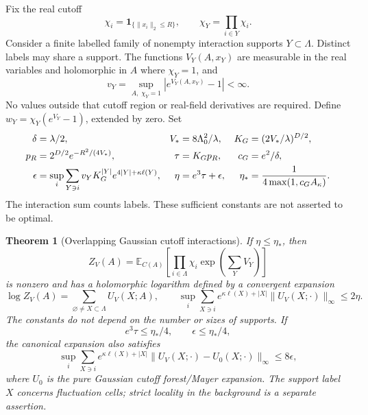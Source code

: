 \documentclass[11pt]{article}
\newtheorem{theorem}{Theorem}[section]
\theoremstyle{remark}
\begin{document}
Fix the real cutoff
\[
 \chi_i=\mathbf1_{\{\|x_i\|_2\le R\}},\qquad
 \chi_Y=\prod_{i\in Y}\chi_i.
\]
Consider a finite labelled family of nonempty interaction supports
$Y\subset\Lambda$. Distinct labels may share a support.
The functions $V_Y(A,x_Y)$ are measurable in the real variables and
holomorphic in $A$ where $\chi_Y=1$, and
\begin{equation}\label{oi-multiplier}
 v_Y=\sup_{A,\;\chi_Y=1}|e^{V_Y(A,x_Y)}-1|<\infty.
\end{equation}
No values outside that cutoff region or real-field derivatives are
required. Define $w_Y=\chi_Y(e^{V_Y}-1)$, extended by zero.
Set
\begin{align}
 \delta&=\lambda/2,&
 V_*&=8\Lambda_0^2/\lambda,&
 K_G&=(2V_*/\lambda)^{D/2},\notag\\
 p_R&=2^{D/2}e^{-R^2/(4V_*)},&
 \tau&=K_Gp_R,& c_G&=e^2/\delta,                 \label{oi-constants}\\
 \epsilon&=\sup_i\sum_{Y\ni i}
      v_Y K_G^{|Y|}e^{4|Y|+\kappa\ell(Y)},&
 \eta&=e^3\tau+\epsilon,&
 \eta_*&=\frac1{4\max(1,c_GA_\kappa)}.           \label{oi-smallness}
\end{align}
The interaction sum counts labels. These sufficient constants are
not asserted to be optimal.

\begin{theorem}[Overlapping Gaussian cutoff interactions]
\label{oi-theorem}
If $\eta\le\eta_*$, then
\[
 Z_V(A)=\mathbb E_{C(A)}
   \left[\prod_{i\in\Lambda}\chi_i
              \exp\left(\sum_YV_Y\right)\right]
\]
is nonzero and has a holomorphic logarithm defined by a convergent
expansion
\begin{equation}\label{oi-log}
 \log Z_V(A)=\sum_{\varnothing\ne X\subset\Lambda}U_V(X;A),\qquad
 \sup_i\sum_{X\ni i}e^{\kappa\ell(X)+|X|}
       \|U_V(X;\cdot)\|_\infty\le2\eta .
\end{equation}
The constants do not depend on the number or sizes of supports.
If
\begin{equation}\label{oi-quarter}
 e^3\tau\le\eta_*/4,\qquad \epsilon\le\eta_*/4,
\end{equation}
the canonical expansion also satisfies
\begin{equation}\label{oi-difference}
 \sup_i\sum_{X\ni i}e^{\kappa\ell(X)+|X|}
      \|U_V(X;\cdot)-U_0(X;\cdot)\|_\infty
 \le8\epsilon ,
\end{equation}
where $U_0$ is the pure Gaussian cutoff forest/Mayer expansion.
The support label $X$ concerns fluctuation cells; strict locality
in the background is a separate assertion.
\end{theorem}
\end{document}

